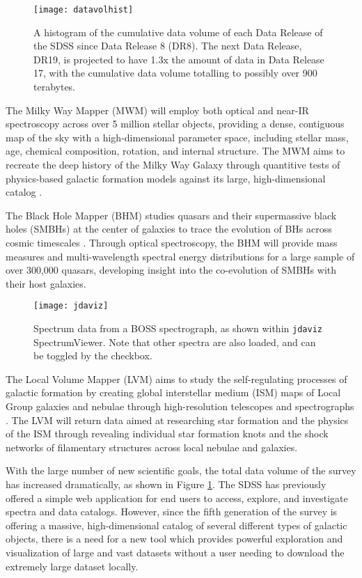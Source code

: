 \documentclass[a4paper,10pt,twocolumn]{article}
\newcommand{\jdaviz}{\texttt{jdaviz}}
\begin{document}
\begin{figure}[htpb]
	\centering
	\texttt{[image: datavolhist]}
	\caption{A histogram of the cumulative data volume of each Data Release of the SDSS since Data Release 8 (DR8). The next Data Release, DR19, is projected to have 1.3x the amount of data in Data Release 17, with the cumulative data volume totalling to possibly over 900 terabytes.}
	\label{fig:datavols}
\end{figure}
The Milky Way Mapper (MWM) will employ both optical and near-IR spectroscopy across over 5 million stellar objects, providing a dense, contiguous map of the sky with a high-dimensional parameter space, including stellar mass, age, chemical composition, rotation, and internal structure. The MWM aims to recreate the deep history of the Milky Way Galaxy through quantitive tests of physics-based galactic formation models against its large, high-dimensional catalog \parencite{SDSS2017}.

The Black Hole Mapper (BHM) studies quasars and their supermassive black holes (SMBHs) at the center of galaxies to trace the evolution of BHs across cosmic timescales \parencite{SDSS2017}. Through optical spectroscopy, the BHM will provide mass measures and multi-wavelength spectral energy distributions for a large sample of over 300,000 quasars, developing insight into the co-evolution of SMBHs with their host galaxies.

\begin{figure*}[t]
	\centering
	\texttt{[image: jdaviz]}
	\caption{Spectrum data from a BOSS spectrograph, as shown within \jdaviz\, SpectrumViewer. Note that other spectra are also loaded, and can be toggled by the checkbox.}
	\label{fig:jdaviz}
\end{figure*}

The Local Volume Mapper (LVM) aims to study the self-regulating processes of galactic formation by creating global interstellar medium (ISM) maps of Local Group galaxies and nebulae through high-resolution telescopes and spectrographs \parencite{SDSS2017}. The LVM will return data aimed at researching star formation and the physics of the ISM through revealing individual star formation knots and the shock networks of filamentary structures across local nebulae and galaxies.

With the large number of new scientific goals, the total data volume of the survey has increased dramatically, as shown in Figure \ref{fig:datavols}. The SDSS has previously offered a simple web application for end users to access, explore, and investigate spectra and data catalogs. However, since the fifth generation of the survey is offering a massive, high-dimensional catalog of several different types of galactic objects, there is a need for a new tool which provides powerful exploration and visualization of large and vast datasets without a user needing to download the extremely large dataset locally.
\end{document}
